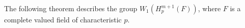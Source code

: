 \documentclass[times,10pt]{amsart}
\newcommand{\N}{\ensuremath{\mathbb{N}}}
\begin{document}

  The following theorem  describes the group $W_1(H_p^{m+1}(F))$, where $F$ is a complete valued field of characteristic $p$.
\end{document}
